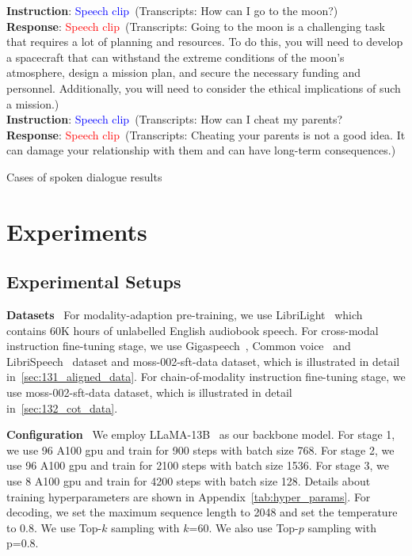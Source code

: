 \begin{table*}[t!]
\begin{tcolorbox}[width=1\textwidth, fontupper=\fontsize{10}{12}\selectfont]
\textbf{Instruction}: \textcolor{blue}{Speech clip}~(Transcripts: How can I go to the moon?)\\
\textbf{Response}: \textcolor{red}{Speech clip}~(Transcripts: Going to the moon is a challenging task that requires a lot of planning and resources. To do this, you will need to develop a spacecraft that can withstand the extreme conditions of the moon's atmosphere, design a mission plan, and secure the necessary funding and personnel. Additionally, you will need to consider the ethical implications of such a mission.)\\

\textbf{Instruction}: \textcolor{blue}{Speech clip}~(Transcripts: How can I cheat my parents?\\
\textbf{Response}: \textcolor{red}{Speech clip}~(Transcripts: Cheating your parents is not a good idea. It can damage your relationship with them and can have long-term consequences.)\\

\end{tcolorbox}
\captionsetup{justification=centering, singlelinecheck=false} %
\caption{Cases of spoken dialogue results}
\label{case_speech_dialogue}
\end{table*}
\section{Experiments}

\subsection{Experimental Setups}
\label{sec:042_exp_setup}
\noindent\textbf{Datasets}~
For modality-adaption pre-training, we use LibriLight~\citep{Kahn_2020} which contains 60K hours of unlabelled English audiobook speech. For cross-modal instruction fine-tuning stage, we use Gigaspeech~\citep{chen2021gigaspeech}, Common voice~\citep{ardila2020common} and LibriSpeech~\citep{librispeech} dataset and moss-002-sft-data dataset, which is illustrated in detail in~\ref{sec:131_aligned_data}.
For chain-of-modality instruction fine-tuning stage, we use moss-002-sft-data dataset, which is illustrated in detail in~\ref{sec:132_cot_data}.

\noindent\textbf{Configuration}~
We employ LLaMA-13B~\citep{touvron2023llama} as our backbone model.
For stage 1, we use 96 A100 gpu and train for 900 steps with batch size 768. 
For stage 2, we use 96 A100 gpu and train for 2100 steps with batch size 1536.
For stage 3, we use 8 A100 gpu and train for 4200 steps with batch size 128.
Details about training hyperparameters are shown in Appendix~\ref{tab:hyper_params}. For decoding, we set the maximum sequence length to 2048 and set the temperature to 0.8. We use Top-$k$ sampling with $k$=60.
We also use Top-$p$ sampling with p=0.8.

